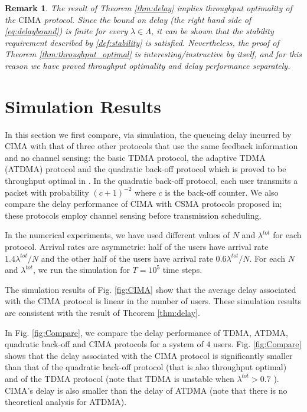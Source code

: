 \documentclass[onecolumn,draftcls]{IEEEtran}
\newtheorem{remark}{Remark}
\newcommand{\g}{\text{CIMA}}
\begin{document}
\begin{remark}
The result of Theorem \ref{thm:delay} implies throughput optimality of the $\g$ protocol.
Since the bound on delay (the right hand side of \eqref{eq:delaybound}) is finite for every $\lambda\in\Lambda$, it can be shown that the stability requirement described by \eqref{def:stability} is satisfied. Nevertheless, the proof of Theorem \ref{thm:throughput_optimal} is interesting/instructive by itself, and for this reason we have proved throughput optimality and delay performance separately.
\end{remark}

\section{Simulation Results}
\label{sec:simulation}

In this section we first compare, via simulation, the queueing delay incurred by $\g$ with 
that of three other protocols that use the same feedback information and no channel sensing: the basic TDMA protocol, the adaptive TDMA (ATDMA) protocol \cite{papadimitriou2003adaptive} and the quadratic back-off protocol which is proved to be throughput optimal in \cite{haastad1996analysis}. 
In the quadratic back-off protocol, each user transmits a packet with probability $(c+1)^{-2}$ where $c$ is the back-off counter.
We also compare the delay performance of $\g$ with CSMA protocols proposed in\cite{chlebus2012adversarial,anantharamu2009adversarial}; these protocols employ channel sensing before transmission scheduling.

In the numerical experiments, we have used different values of $N$ and $\lambda^{tot}$ for each protocol.
Arrival rates are asymmetric: half of the users have arrival rate $1.4\lambda^{tot}/N$ and the other half of the users have arrival rate $0.6\lambda^{tot}/N$.
For each $N$ and $\lambda^{tot}$, we run the simulation for $T = 10^5$ time steps. 



The simulation results of Fig. \ref{fig:CIMA} show that the average delay associated with the $\g$ protocol is linear in the number of users. These simulation results are consistent with the result of Theorem \ref{thm:delay}.

In Fig. \ref{fig:Compare}, we compare the delay performance of TDMA, ATDMA, quadratic back-off and CIMA protocols for a system of $4$ users.
Fig. \ref{fig:Compare} shows that the delay associated with the $\g$ protocol is significantly smaller than that of the quadratic back-off protocol (that is also throughput optimal) and of the TDMA protocol (note that TDMA is unstable when $\lambda^{tot}>0.7$ ). $\g$'s delay is also smaller than the delay of ATDMA (note that there is no theoretical analysis for ATDMA).
\end{document}
